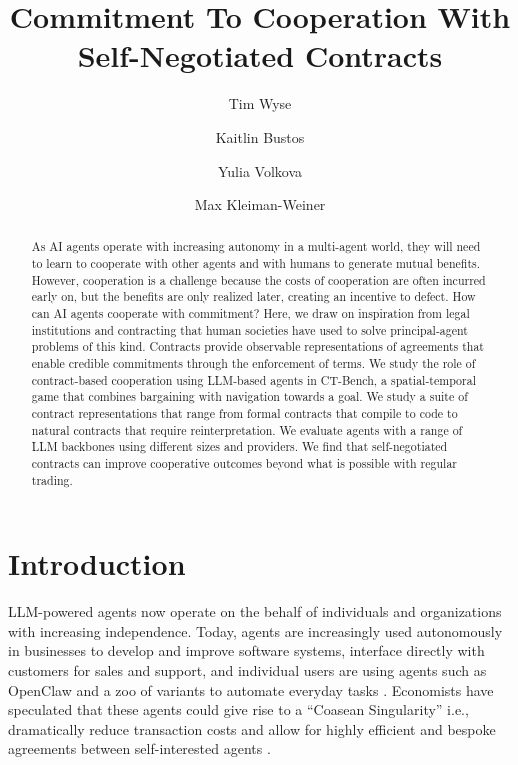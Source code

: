 \documentclass{article} %
\title{Commitment To Cooperation With Self-Negotiated Contracts}
\author[1*]{Tim Wyse}
\author[1*]{Kaitlin Bustos}
\author[1*]{Yulia Volkova}
\author[2]{Max Kleiman-Weiner}
\affil[1]{Algoverse AI Research}
\affil[2]{University of Washington}
\newcommand{\CT}{CT-Bench\xspace}
\begin{document}
\ifcolmsubmission
\linenumbers
\fi

\maketitle
{\let\thefootnote\relax{}}
\setcounter{footnote}{0}


\begin{abstract}
As AI agents operate with increasing autonomy in a multi-agent world, they will need to learn to cooperate with other agents and with humans to generate mutual benefits. However, cooperation is a challenge because the costs of cooperation are often incurred early on, but the benefits are only realized later, creating an incentive to defect. How can AI agents cooperate with commitment? Here, we draw on inspiration from legal institutions and contracting that human societies have used to solve principal-agent problems of this kind. Contracts provide observable representations of agreements that enable credible commitments through the enforcement of terms. We study the role of contract-based cooperation using LLM-based agents in \CT, a spatial-temporal game that combines bargaining with navigation towards a goal. We study a suite of contract representations that range from formal contracts that compile to code to natural contracts that require reinterpretation. We evaluate agents with a range of LLM backbones using different sizes and providers. We find that self-negotiated contracts can improve cooperative outcomes beyond what is possible with regular trading.
\end{abstract}


\section{Introduction}

LLM-powered agents now operate on the behalf of individuals and organizations with increasing independence. Today, agents are increasingly used autonomously in businesses to develop and improve software systems, interface directly with customers for sales and support, and individual users are using agents such as OpenClaw and a zoo of variants to automate everyday tasks \citep{Steinberger2026openclaw}. Economists have speculated that these agents could give rise to a ``Coasean Singularity'' i.e., dramatically reduce transaction costs and allow for highly efficient and bespoke agreements between self-interested agents \citep{shahidi2025coasean}. 
\end{document}
